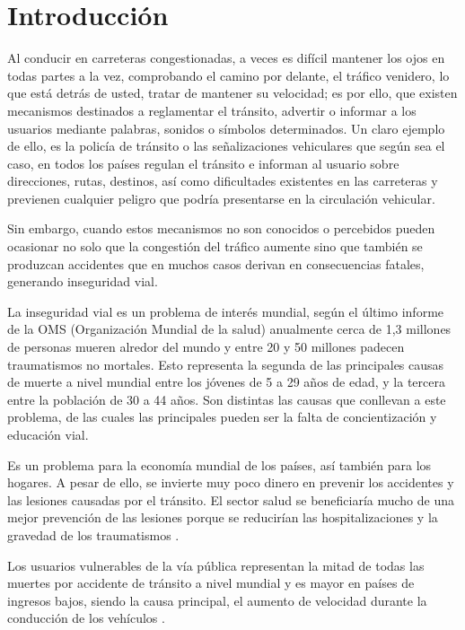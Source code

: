 \chapter{Introducción}
	\setcounter{page}{1}
	\renewcommand{\baselinestretch}{1} %
	Al conducir en carreteras congestionadas, a veces es difícil mantener los ojos en todas partes a la vez, comprobando el camino por delante, el tráfico venidero, lo que está detrás de usted, tratar de mantener su velocidad; es por ello, que existen mecanismos destinados a reglamentar el tránsito, advertir o informar a los usuarios mediante palabras, sonidos o símbolos determinados. Un claro ejemplo de ello, es la policía de tránsito o las señalizaciones vehiculares que según sea el caso, en todos los países regulan el tránsito e informan al usuario sobre direcciones, rutas, destinos, así como dificultades existentes en las carreteras y previenen cualquier peligro que podría presentarse en la circulación vehicular.

	\vskip 0.15cm
	Sin embargo, cuando estos mecanismos no son conocidos o percebidos pueden ocasionar no solo que la congestión del tráfico aumente sino que también se produzcan accidentes que en muchos casos derivan en consecuencias fatales, generando inseguridad vial.

	\vskip 0.15cm
	La inseguridad vial es un problema de interés mundial, según el último informe de la OMS (Organización Mundial de la salud) anualmente cerca de 1,3 millones de personas mueren alredor del mundo y entre 20 y 50 millones padecen traumatismos no mortales\citep{OMS}. Esto representa la segunda de las principales causas de muerte a nivel mundial entre los jóvenes de 5 a 29 años de edad, y la tercera entre la población de 30 a 44 años. Son distintas las causas que conllevan a este problema, de las cuales las principales pueden ser la falta de concientización y educación vial. 
	
	\vskip 0.15cm	
	Es un problema para la economía mundial de los países, así también para los hogares. A pesar de ello, se invierte muy poco dinero en prevenir los accidentes y las lesiones causadas por el tránsito. El sector salud se beneficiaría mucho de una mejor prevención de las lesiones porque se reducirían las hospitalizaciones y la gravedad de los traumatismos \citep{CNSV}.

	\vskip 0.15cm
	Los usuarios vulnerables de la vía pública representan la mitad de todas las muertes por accidente de tránsito a nivel mundial y es mayor en países de ingresos bajos, siendo la causa principal, el aumento de velocidad durante la conducción de los vehículos \citep{OMS}.

